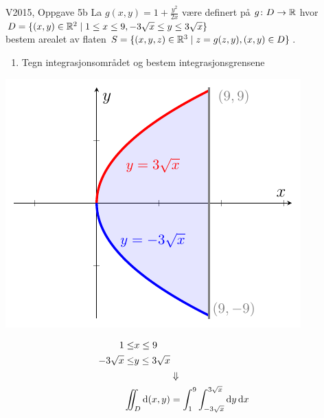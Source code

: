 \begin{frame}
  \begin{oppgave}{V2015, Oppgave 5b}
    La $g(x,y) = 1+\frac{y^2}{2x}$ være definert på $g\colon D \to \mathbb{R}$ hvor
    $D = \{(x,y) \in \mathbb{R}^2 \mid 1 \leq x \leq 9, -3 \sqrt{x} \leq y \leq 3 \sqrt{x}\}$
    \\ bestem arealet av flaten $S = \{(x,y,z)\in \mathbb{R}^3 \mid z = g(z,y), (x,y) \in D\}$.
  \end{oppgave}
  \begin{enumerate}
    \item Tegn integrasjonsområdet og bestem integrasjonsgrensene
  \end{enumerate}
  \begin{minipage}[b]{0.45\textwidth}\centering
    \includegraphics{../img/overflateintegral-2015V}
  \end{minipage}\hfill
  \begin{minipage}[b]{0.45\textwidth}\centering\vspace*{-3cm}
  \begin{align*}
    \begin{split}
    1 \leq & x \leq 9 \\
    -3 \sqrt{x} \leq & y \leq 3 \sqrt{x}
  \end{split} \\ \ & \Downarrow \ \\
   \iint_D \dd(x,y) & = \int_1^{9} \int_{-3\sqrt{x}}^{3\sqrt{x}}\dy \dx
  \end{align*}
  \vspace{1cm}
  \phantom{a//a//a//a//a//a//a//a//a//a//a}
  \end{minipage}
\end{frame}

